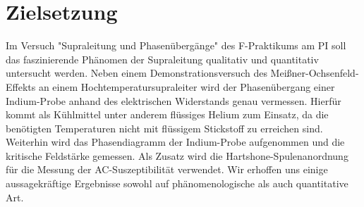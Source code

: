 \section{Zielsetzung}
Im Versuch "Supraleitung und Phasenübergänge" des F-Praktikums am PI soll das faszinierende Phänomen der Supraleitung qualitativ und quantitativ untersucht werden. Neben einem Demonstrationsversuch des Meißner-Ochsenfeld-Effekts an einem Hochtemperatursupraleiter wird der Phasenübergang einer Indium-Probe anhand des elektrischen Widerstands genau vermessen. Hierfür kommt als Kühlmittel unter anderem flüssiges Helium zum Einsatz, da die benötigten Temperaturen nicht mit flüssigem Stickstoff zu erreichen sind. Weiterhin wird das Phasendiagramm der Indium-Probe aufgenommen und die kritische Feldstärke gemessen. Als Zusatz wird die Hartshone-Spulenanordnung für die Messung der AC-Suszeptibilität verwendet. Wir erhoffen uns einige aussagekräftige Ergebnisse sowohl auf phänomenologische als auch quantitative Art. 